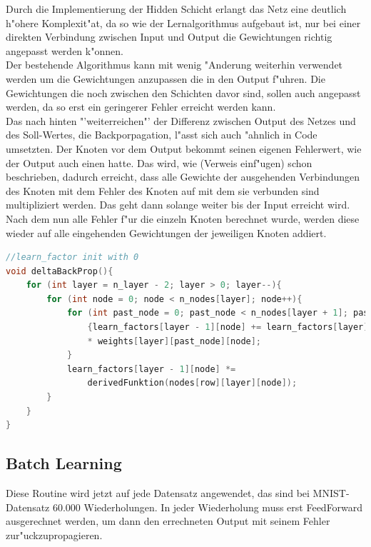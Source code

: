 \documentclass[12pt,a4paper]{scrartcl}
\begin{document}
Durch die Implementierung der Hidden Schicht erlangt das Netz eine deutlich h"ohere Komplexit"at, da so wie der Lernalgorithmus aufgebaut ist, nur bei einer direkten Verbindung zwischen Input und Output die Gewichtungen richtig angepasst werden k"onnen.\\

Der bestehende Algorithmus kann mit wenig "Anderung weiterhin verwendet werden um die Gewichtungen anzupassen die in den Output f"uhren. Die Gewichtungen die noch zwischen den Schichten davor sind, sollen auch angepasst werden, da so erst ein geringerer Fehler erreicht werden kann.\\

Das nach hinten "'weiterreichen"' der Differenz zwischen Output des Netzes und des Soll-Wertes, die Backporpagation, l"asst sich auch "ahnlich in Code umsetzten. Der Knoten vor dem Output bekommt seinen eigenen Fehlerwert, wie der Output auch einen hatte. Das wird, wie (Verweis einf"ugen) schon beschrieben, dadurch erreicht, dass alle Gewichte der ausgehenden Verbindungen des Knoten mit dem Fehler des Knoten auf mit dem sie verbunden sind multipliziert werden. Das geht dann solange weiter bis der Input erreicht wird.\\

Nach dem nun alle Fehler f"ur die einzeln Knoten berechnet wurde, werden diese wieder auf alle eingehenden Gewichtungen der jeweiligen Knoten addiert. 




\begin{lstlisting}[language=C]
//learn_factor init with 0 
void deltaBackProp(){
	for (int layer = n_layer - 2; layer > 0; layer--){
		for (int node = 0; node < n_nodes[layer]; node++){
			for (int past_node = 0; past_node < n_nodes[layer + 1]; past_node++) 
				{learn_factors[layer - 1][node] += learn_factors[layer][past_node] 
				* weights[layer][past_node][node];
			}
			learn_factors[layer - 1][node] *= 
				derivedFunktion(nodes[row][layer][node]);
		}
	}
}
\end{lstlisting}



\subsection{Batch Learning}

Diese Routine wird jetzt auf jede Datensatz angewendet, das sind bei MNIST-Datensatz 60.000 Wiederholungen. In jeder Wiederholung muss erst FeedForward ausgerechnet werden, um dann den errechneten Output mit seinem Fehler zur"uckzupropagieren.\\
\end{document}
